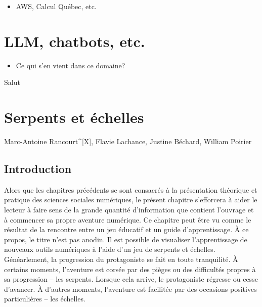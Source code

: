 \documentclass[
  letterpaper,
]{scrbook}
\providecommand{\tightlist}{%
  \setlength{\itemsep}{0pt}\setlength{\parskip}{0pt}}\usepackage{longtable,booktabs,array}
\begin{document}
\begin{itemize}
\tightlist
\item
  AWS, Calcul Québec, etc.
\end{itemize}


\hypertarget{llm-chatbots-etc.}{%
\chapter{LLM, chatbots, etc.}\label{llm-chatbots-etc.}}

\begin{itemize}
\tightlist
\item
  Ce qui s'en vient dans ce domaine?
\end{itemize}

Salut


\hypertarget{serpents-et-uxe9chelles}{%
\chapter{Serpents et échelles}\label{serpents-et-uxe9chelles}}

\begin{center}

Marc-Antoine Rancourt^[X], Flavie Lachance, Justine Béchard, William Poirier

\end{center}

\hypertarget{introduction-2}{%
\section{Introduction}\label{introduction-2}}

Alors que les chapitres précédents se sont consacrés à la présentation
théorique et pratique des sciences sociales numériques, le présent
chapitre s'efforcera à aider le lecteur à faire sens de la grande
quantité d'information que contient l'ouvrage et à commencer sa propre
aventure numérique. Ce chapitre peut être vu comme le résultat de la
rencontre entre un jeu éducatif et un guide d'apprentissage. À ce
propos, le titre n'est pas anodin. Il est possible de visualiser
l'apprentissage de nouveaux outils numériques à l'aide d'un jeu de
serpents et échelles. Généarlement, la progression du protagoniste se
fait en toute tranquilité. À certains moments, l'aventure est corsée par
des pièges ou des difficultés propres à sa progression -- les serpents.
Lorsque cela arrive, le protagoniste régresse ou cesse d'avancer. À
d'autres moments, l'aventure est facilitée par des occasions positives
particulières -- les échelles.
\end{document}
